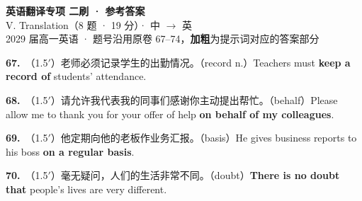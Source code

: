 \documentclass[10pt,a4paper]{article}
\newcommand{\A}[1]{\textbf{#1}}
\newcommand{\ans}[3]{\noindent\textbf{#1.}~{\footnotesize（#2）}#3\par\vspace{0.42em}}
\begin{document}
\pagestyle{plain}

\begin{center}
{\LARGE\bfseries 英语翻译专项 \quad 二刷 · 参考答案}\\[0.25em]
{\large V. Translation（8 题 · 19 分）· 中 $\to$ 英}\\[0.22em]
{\small 2029 届高一英语 · 题号沿用原卷 67--74，\A{加粗}为提示词对应的答案部分}
\end{center}

\vspace{0.3em}

\vspace{0.45em}
\ans{67}{1.5$'$}{老师必须记录学生的出勤情况。（record n.）\newline\hspace{1.2em}Teachers must \A{keep a record of} students' attendance.}
\ans{68}{1.5$'$}{请允许我代表我的同事们感谢你主动提出帮忙。（behalf）\newline\hspace{1.2em}Please allow me to thank you for your offer of help \A{on behalf of my colleagues}.}
\ans{69}{1.5$'$}{他定期向他的老板作业务汇报。（basis）\newline\hspace{1.2em}He gives business reports to his boss \A{on a regular basis}.}
\ans{70}{1.5$'$}{毫无疑问，人们的生活非常不同。（doubt）\newline\hspace{1.2em}\A{There is no doubt that} people's lives are very different.}
\end{document}
